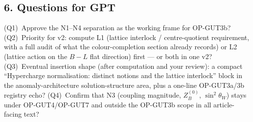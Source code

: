 \subsection*{6. Questions for GPT}
(Q1)~Approve the N1--N4 separation as the working frame for
OP-GUT3b?
(Q2)~Priority for v2: compute L1 (lattice interlock /
centre-quotient requirement, with a full audit of what the
colour-completion section already records) or L2 (lattice action
on the $B{-}L$ flat direction) first --- or both in one v2?
(Q3)~Eventual insertion shape (after computation and your
review): a compact ``Hypercharge normalisation: distinct notions
and the lattice interlock'' block in the anomaly-architecture
solution-structure area, plus a one-line OP-GUT3a/3b registry
echo?
(Q4)~Confirm that N3 (coupling magnitude, $Z_B^{(0)}$,
$\sin^2\theta_W$) stays under OP-GUT4/OP-GUT7 and outside the
OP-GUT3b scope in all article-facing text?

